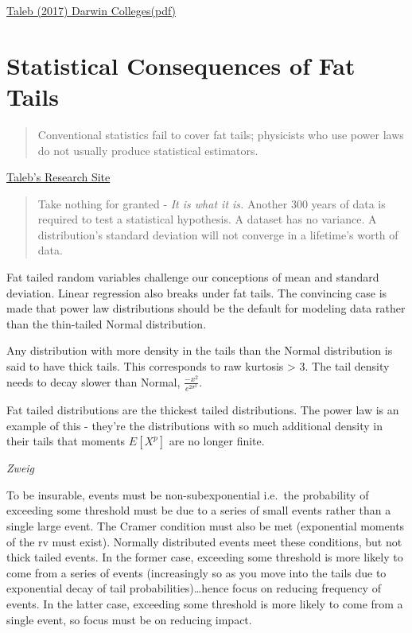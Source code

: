 \documentclass[
]{book}
\begin{document}
\href{/pdf/Taleb_2017_Extremes_DarwinCollege.pdf}{Taleb (2017) Darwin Colleges(pdf)}

\hypertarget{statistical-consequences-of-fat-tails}{%
\section{Statistical Consequences of Fat Tails}\label{statistical-consequences-of-fat-tails}}

\begin{quote}
Conventional statistics fail to cover fat tails;
physicists who use power laws do not usually produce statistical estimators.
\end{quote}

\href{https://www.fooledbyrandomness.com/FatTails.html}{Taleb's Research Site}

\begin{quote}
Take nothing for granted - \emph{It is what it is.}
Another 300 years of data is required to test a statistical hypothesis.
A dataset has no variance.
A distribution's standard deviation will not converge in a lifetime's worth of data.
\end{quote}

Fat tailed random variables challenge our conceptions of mean and standard deviation.
Linear regression also breaks under fat tails.
The convincing case is made that power law distributions should be the default
for modeling data rather than the thin-tailed Normal distribution.

Any distribution with more density in the tails than the Normal distribution
is said to have thick tails.
This corresponds to raw kurtosis \textgreater{} 3.
The tail density needs to decay slower than Normal, \(\frac{-x^2}{e^{2\sigma^2}}\).

Fat tailed distributions are the thickest tailed distributions.
The power law is an example of this -
they're the distributions with so much additional density in their tails
that moments \(E[X^p]\) are no longer finite.

\emph{Zweig}

To be insurable, events must be non-subexponential i.e.~the probability of exceeding some threshold must be due to a series of small events rather than a single large event. The Cramer condition must also be met (exponential moments of the rv must exist). Normally distributed events meet these conditions, but not thick tailed events. In the former case, exceeding some threshold is more likely to come from a series of events (increasingly so as you move into the tails due to exponential decay of tail probabilities)\ldots hence focus on reducing frequency of events. In the latter case, exceeding some threshold is more likely to come from a single event, so focus must be on reducing impact.
\end{document}

